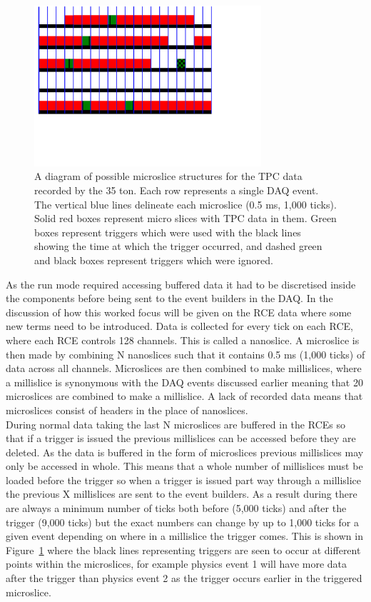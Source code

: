 \begin{figure}[htbp!]
  \centering
  \includegraphics[width=0.75\textwidth]{DataStructure}
  \caption[DataStructure]{A diagram of possible microslice structures for the TPC data recorded by the 35 ton. Each row represents a single DAQ event. The vertical blue lines delineate each microslice (0.5 ms, 1,000 ticks). Solid red boxes represent micro slices with TPC data in them. Green boxes represent triggers which were used with the black lines showing the time at which the trigger occurred, and dashed green and black boxes represent triggers which were ignored.}
  \label{fig:DataStructure}
\end{figure}

As the run mode required accessing buffered data it had to be discretised inside the components before being sent to the event builders in the DAQ. In the discussion of how this worked focus will be given on the RCE data where some new terms need to be introduced. Data is collected for every tick on each RCE, where each RCE controls 128 channels. This is called a nanoslice. A microslice is then made by combining N nanoslices such that it contains 0.5 ms (1,000 ticks) of data across all channels. Microslices are then combined to make millislices, where a millislice is synonymous with the DAQ events discussed earlier meaning that 20 microslices are combined to make a millislice. A lack of recorded data means that microslices consist of headers in the place of nanoslices. \\

During normal data taking the last N microslices are buffered in the RCEs so that if a trigger is issued the previous millislices can be accessed before they are deleted. As the data is buffered in the form of microslices previous millislices may only be accessed in whole. This means that a whole number of millislices must be loaded before the trigger so when a trigger is issued part way through a millislice the previous X millislices are sent to the event builders. As a result during there are always a minimum number of ticks both before (5,000 ticks) and after the trigger (9,000 ticks) but the exact numbers can change by up to 1,000 ticks for a given event depending on where in a millislice the trigger comes. This is shown in Figure~\ref{fig:DataStructure} where the black lines representing triggers are seen to occur at different points within the microslices, for example physics event 1 will have more data after the trigger than physics event 2 as the trigger occurs earlier in the triggered microslice. \\

